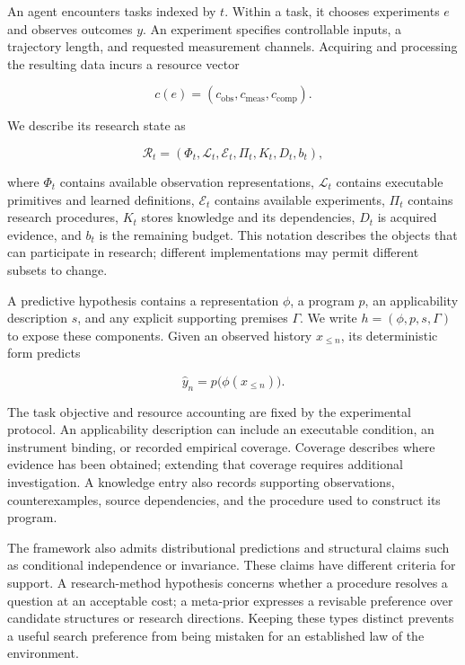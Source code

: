\documentclass[11pt,a4paper]{article}
\begin{document}
An agent encounters tasks indexed by \(t\). Within a task, it chooses experiments \(e\) and observes outcomes \(y\). An experiment specifies controllable inputs, a trajectory length, and requested measurement channels. Acquiring and processing the resulting data incurs a resource vector


\[
c(e)=(c_{\mathrm{obs}},c_{\mathrm{meas}},c_{\mathrm{comp}}).
\]


We describe its research state as


\[
\mathcal R_t=(\Phi_t,\mathcal L_t,\mathcal E_t,\Pi_t,K_t,D_t,b_t),
\]


where \(\Phi_t\) contains available observation representations, \(\mathcal L_t\) contains executable primitives and learned definitions, \(\mathcal E_t\) contains available experiments, \(\Pi_t\) contains research procedures, \(K_t\) stores knowledge and its dependencies, \(D_t\) is acquired evidence, and \(b_t\) is the remaining budget. This notation describes the objects that can participate in research; different implementations may permit different subsets to change.


A predictive hypothesis contains a representation \(\phi\), a program \(p\), an applicability description \(s\), and any explicit supporting premises \(\Gamma\). We write \(h=(\phi,p,s,\Gamma)\) to expose these components. Given an observed history \(x_{\leq n}\), its deterministic form predicts


\[
\hat y_n=p\bigl(\phi(x_{\leq n})\bigr).
\]


The task objective and resource accounting are fixed by the experimental protocol. An applicability description can include an executable condition, an instrument binding, or recorded empirical coverage. Coverage describes where evidence has been obtained; extending that coverage requires additional investigation. A knowledge entry also records supporting observations, counterexamples, source dependencies, and the procedure used to construct its program.


The framework also admits distributional predictions and structural claims such as conditional independence or invariance. These claims have different criteria for support. A research-method hypothesis concerns whether a procedure resolves a question at an acceptable cost; a meta-prior expresses a revisable preference over candidate structures or research directions. Keeping these types distinct prevents a useful search preference from being mistaken for an established law of the environment.
\end{document}

